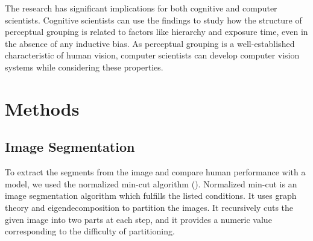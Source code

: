 \documentclass{article}
\begin{document}
The research has significant implications for both cognitive and computer scientists. Cognitive scientists can use the findings to study how the structure of perceptual grouping is related to factors like hierarchy and exposure time, even in the absence of any inductive bias. As perceptual grouping is a well-established characteristic of human vision, computer scientists can develop computer vision systems while considering these properties.


\section{Methods}
\subsection{Image Segmentation} \label{imageSegmentation}
To extract the segments from the image and compare human performance with a model, we used the normalized min-cut algorithm (\cite{RN165}). Normalized min-cut is an image segmentation algorithm which fulfills the listed conditions. It uses graph theory and eigendecomposition to partition the images. It recursively cuts the given image into two parts at each step, and it provides a numeric value corresponding to the difficulty of partitioning. 
\end{document}
